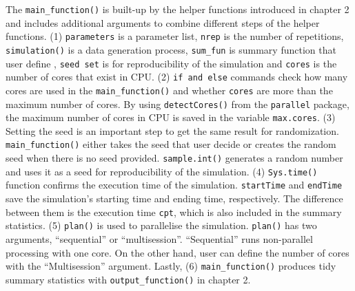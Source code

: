 \documentclass[11pt,a4paper]{article}
\begin{document}
The \texttt{main\_function()} is built-up by the helper functions
introduced in chapter 2 and includes additional arguments to combine
different steps of the helper functions. (1) \texttt{parameters} is a
parameter list, \texttt{nrep} is the number of repetitions,
\texttt{simulation()} is a data generation process, \texttt{sum\_fun} is
summary function that user define , \texttt{seed\ set} is for
reproducibility of the simulation and \texttt{cores} is the number of
cores that exist in CPU. (2) \texttt{if\ and\ else} commands check how
many cores are used in the \texttt{main\_function()} and whether
\texttt{cores} are more than the maximum number of cores. By using
\texttt{detectCores()} from the \texttt{parallel} package, the maximum
number of cores in CPU is saved in the variable \texttt{max.cores}. (3)
Setting the seed is an important step to get the same result for
randomization. \texttt{main\_function()} either takes the seed that user
decide or creates the random seed when there is no seed provided.
\texttt{sample.int()} generates a random number and uses it as a seed
for reproducibility of the simulation. (4) \texttt{Sys.time()} function
confirms the execution time of the simulation. \texttt{startTime} and
\texttt{endTime} save the simulation's starting time and ending time,
respectively. The difference between them is the execution time
\texttt{cpt}, which is also included in the summary statistics. (5)
\texttt{plan()} is used to parallelise the simulation. \texttt{plan()}
has two arguments, ``sequential'' or ``multisession''. ``Sequential''
runs non-parallel processing with one core. On the other hand, user can
define the number of cores with the ``Multisession'' argument. Lastly,
(6) \texttt{main\_function()} produces tidy summary statistics with
\texttt{output\_function()} in chapter 2.
\end{document}
